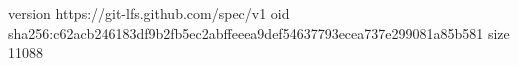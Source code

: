 version https://git-lfs.github.com/spec/v1
oid sha256:c62acb246183df9b2fb5ec2abffeeea9def54637793ecea737e299081a85b581
size 11088
